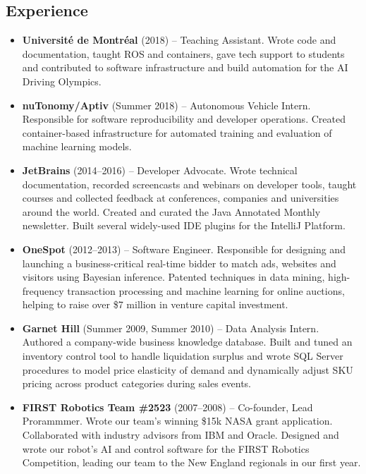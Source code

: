 \documentclass[letterpaper,11pt]{article}
\newcommand{\resumeItem}[2]{
\item\small{
\textbf{#1}{ #2 \vspace{-2pt}}
}
}
\newcommand{\resumeSubItem}[2]{\resumeItem{#1}{#2}\vspace{-4pt}}
\newcommand{\resumeSubHeadingListStart}{\begin{itemize}[leftmargin=*]}
\newcommand{\resumeSubHeadingListEnd}{\end{itemize}}
\begin{document}
\begin{justify}
\section{Experience}
\resumeSubHeadingListStart
\resumeSubItem{Universit\'e de Montr\'eal}{(2018) -- Teaching Assistant. Wrote code and documentation, taught ROS and containers, gave tech support to students and contributed to software infrastructure and build automation for the AI Driving Olympics.}
\resumeSubItem{nuTonomy/Aptiv}{(Summer 2018) -- Autonomous Vehicle Intern. Responsible for software reproducibility and developer operations. Created container-based infrastructure for automated training and evaluation of machine learning models.}
\resumeSubItem{JetBrains}{(2014--2016) -- Developer Advocate. Wrote technical documentation, recorded screencasts and webinars on developer tools, taught courses and collected feedback at conferences, companies and universities around the world. Created and curated the Java Annotated Monthly newsletter. Built several widely-used IDE plugins for the IntelliJ Platform.}
\resumeSubItem{OneSpot}{(2012--2013) -- Software Engineer. Responsible for designing and launching a business-critical real-time bidder to match ads, websites and visitors using Bayesian inference. Patented techniques in data mining, high-frequency transaction processing and machine learning for online auctions, helping to raise over \$7 million in venture capital investment.}
\resumeSubItem{Garnet Hill}{(Summer 2009, Summer 2010) -- Data Analysis Intern. Authored a company-wide business knowledge database. Built and tuned an inventory control tool to handle liquidation surplus and wrote SQL Server procedures to model price elasticity of demand and dynamically adjust SKU pricing across product categories during sales events.}
\resumeSubItem{FIRST Robotics Team \#2523}{(2007--2008) -- Co-founder, Lead Prorammmer. Wrote our team's winning \$15k NASA grant application. Collaborated with industry advisors from IBM and Oracle. Designed and wrote our robot's AI and control software for the FIRST Robotics Competition, leading our team to the New England regionals in our first year.}
\resumeSubHeadingListEnd



\end{justify}
\end{document}
